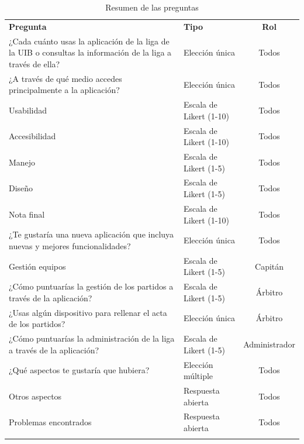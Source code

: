 \begin{table}[H]
    \centering
    \renewcommand{\arraystretch}{1.25}
    \begin{tabularx}{\textwidth}{>{\RaggedRight\arraybackslash}X >{\RaggedRight\arraybackslash}p{2.5cm} c}
        	\textbf{Pregunta} & \textbf{Tipo} & \textbf{Rol} \\ \lightrule
        ¿Cada cuánto usas la aplicación de la liga de la UIB o consultas la información de la liga a través de ella? & Elección única & Todos \\ \lightrule
        ¿A través de qué medio accedes principalmente a la aplicación? & Elección única & Todos \\ \lightrule
        Usabilidad & Escala de Likert (1-10) & Todos \\ \lightrule
        Accesibilidad & Escala de Likert (1-10) & Todos \\ \lightrule
        Manejo & Escala de Likert (1-5) & Todos \\ \lightrule
        Diseño & Escala de Likert (1-5) & Todos \\ \lightrule
        Nota final & Escala de Likert (1-10) & Todos \\ \lightrule
        ¿Te gustaría una nueva aplicación que incluya nuevas y mejores funcionalidades? & Elección única & Todos \\ \lightrule
        Gestión equipos & Escala de Likert (1-5) & Capitán \\ \lightrule
        ¿Cómo puntuarías la gestión de los partidos a través de la aplicación? & Escala de Likert (1-5) & Árbitro \\ \lightrule
        ¿Usas algún dispositivo para rellenar el acta de los partidos? & Elección única & Árbitro \\ \lightrule
        ¿Cómo puntuarías la administración de la liga a través de la aplicación? & Escala de Likert (1-5) & Administrador \\ \lightrule
        ¿Qué aspectos te gustaría que hubiera? & Elección múltiple & Todos \\ \lightrule
        Otros aspectos & Respuesta abierta & Todos \\ \lightrule
        Problemas encontrados & Respuesta abierta & Todos \\ \lightrule
    \end{tabularx}
    \caption{Resumen de las preguntas}
    \label{tab:forms_questions}
\end{table}

